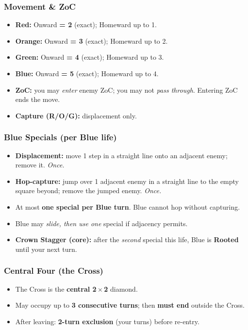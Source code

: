 \documentclass[11pt]{article}
\begin{document}
\begin{multicols}{2}
\subsubsection*{Movement \& ZoC}
\begin{itemize}[leftmargin=1.1em,itemsep=0.2em]
  \item \textbf{Red:} Onward \textbf{= 2} (exact); Homeward up to 1.
  \item \textbf{Orange:} Onward \textbf{= 3} (exact); Homeward up to 2.
  \item \textbf{Green:} Onward \textbf{= 4} (exact); Homeward up to 3.
  \item \textbf{Blue:} Onward \textbf{= 5} (exact); Homeward up to 4.
  \item \textbf{ZoC:} you may \emph{enter} enemy ZoC; you may not \emph{pass through}. Entering ZoC ends the move.
  \item \textbf{Capture (R/O/G):} displacement only.
\end{itemize}

\subsubsection*{Blue Specials (per Blue life)}
\begin{itemize}[leftmargin=1.1em,itemsep=0.2em]
  \item \textbf{Displacement:} move 1 step in a straight line onto an adjacent enemy; remove it. \emph{Once.}
  \item \textbf{Hop-capture:} jump over 1 adjacent enemy in a straight line to the empty square beyond; remove the jumped enemy. \emph{Once.}
  \item At most \textbf{one special per Blue turn}. Blue cannot hop without capturing.
  \item Blue may \emph{slide, then use one} special if adjacency permits.
  \item \textbf{Crown Stagger (core):} after the \emph{second} special this life, Blue is \textbf{Rooted} until your next turn.
\end{itemize}

\subsubsection*{Central Four (the Cross)}
\begin{itemize}[leftmargin=1.1em,itemsep=0.2em]
  \item The Cross is the \textbf{central 2\,$\times$\,2} diamond.
  \item May occupy up to \textbf{3 consecutive turns}; then \textbf{must end} outside the Cross.
  \item After leaving: \textbf{2-turn exclusion} (your turns) before re-entry.
\end{itemize}


\end{multicols}
\end{document}
